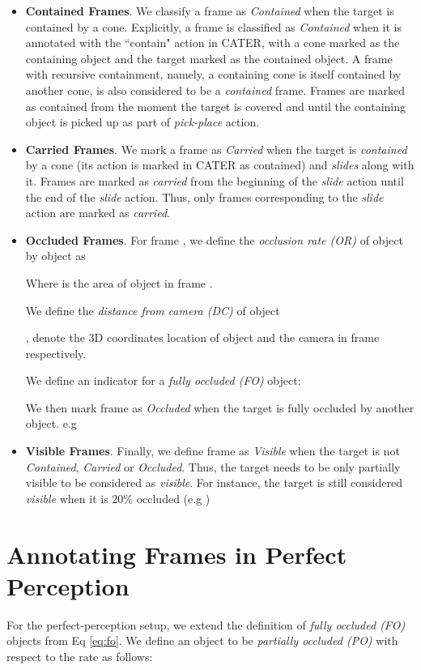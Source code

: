 \documentclass[]{llncs}
\begin{document}
\begin{itemize}
\item \textbf{Contained Frames}.
 We classify a frame as \textit{Contained} when the target is contained by a cone. Explicitly, a frame is classified as \textit{Contained} when it is annotated with the ``contain" action in CATER, with a cone marked as the containing object and the target marked as the contained object. A frame with recursive containment, namely, a containing cone is itself contained by another cone, is also considered to be  a \textit{contained} frame. Frames are marked as contained from the moment the target is covered and until the containing object is picked up as part of \textit{pick-place} action. 
 

\item
\textbf{Carried Frames}. We mark a frame as \textit{Carried} when the target is \textit{contained} by a cone (its action is marked in CATER as contained) and \textit{slides} along with it. Frames are marked as \textit{carried} from the beginning of the \textit{slide} action until the end of the \textit{slide} action. Thus, only frames corresponding to the \textit{slide} action are marked as \textit{carried}.

\item
\textbf{Occluded Frames}. For frame , we define the \textit{occlusion rate (OR)} of object  by object  as

Where  is the area of object  in frame .


We define the \textit{distance from camera (DC)} of object 

,  denote the 3D coordinates location of object  and the camera in frame  respectively.


We define an indicator for a \textit{fully occluded (FO)} object:


We then mark frame  as \textit{Occluded} when the target is fully occluded by another object. e.g 

\item
\textbf{Visible Frames}. Finally, we define frame as \textit{Visible} when the target is not \textit{Contained}, \textit{Carried} or \textit{Occluded}. Thus, the target needs to be only partially visible to be considered as \textit{visible}. For instance, the target is still considered \textit{visible} when it is 20\% occluded (e.g )

\end{itemize}

\section{Annotating Frames in Perfect Perception}
\label{sec:pp_annotation}
For the perfect-perception setup, we extend the definition of \textit{fully occluded (FO)} objects from Eq \ref{eq:fo}.
We define an object to be \textit{partially occluded (PO)} with respect to the rate  as follows:
\end{document}
